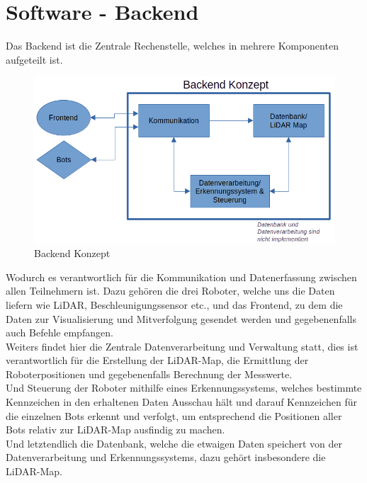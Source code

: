 

\chapter{Software - Backend}
\label{sec:software_backend}
Das Backend ist die Zentrale Rechenstelle, 
welches in mehrere Komponenten aufgeteilt ist.

\begin{figure}[H]
    \includegraphics[width=\textwidth, center]{img/backend-konzept.png}
    \caption{Backend Konzept}
    \label{fig:backend_konzept}
\end{figure}

Wodurch es verantwortlich für die Kommunikation und Datenerfassung 
zwischen allen Teilnehmern ist. 
Dazu gehören die drei Roboter, welche uns die Daten liefern wie LiDAR, 
Beschleunigungssensor etc., und das Frontend, 
zu dem die Daten zur Visualisierung und Mitverfolgung gesendet werden 
und gegebenenfalls auch Befehle empfangen.
\\
Weiters findet hier die Zentrale Datenverarbeitung und Verwaltung statt, 
dies ist verantwortlich für die Erstellung der LiDAR-Map, 
die Ermittlung der Roboterpositionen und gegebenenfalls Berechnung der Messwerte. 
\\
Und Steuerung der Roboter mithilfe eines Erkennungssystems, 
welches bestimmte Kennzeichen in den erhaltenen Daten Ausschau hält 
und darauf Kennzeichen für die einzelnen Bots erkennt und verfolgt, 
um entsprechend die Positionen aller Bots relativ zur LiDAR-Map ausfindig zu machen.
% 
\\
Und letztendlich die Datenbank, 
welche die etwaigen Daten speichert von der Datenverarbeitung und Erkennungssystems, 
dazu gehört insbesondere die LiDAR-Map.

